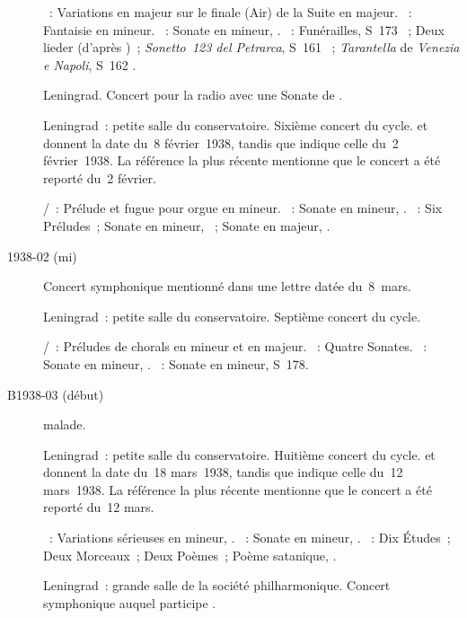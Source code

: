 \begin{description}
 \textsc{\Haendel{}}~: Variations en \kE majeur sur le finale (Air) de la
 Suite  en \kE majeur.
 \textsc{\Mozart{}}~: Fantaisie en \kC mineur.
 \textsc{\Beethoven{}}~: Sonate en \kC mineur, .
 \textsc{\Liszt{}}~: Funérailles, S~173 ~; Deux lieder (d'après
 \Schubert{})~; \emph{Sonetto~123 del Petrarca}, S~161 ~;
 \emph{Tarantella} de \emph{Venezia e Napoli}, S~162 .
 \item[\DateWithWeekDay{1938-02-01}]
 Leningrad.
 Concert pour la radio avec une Sonate de \Haydn{}.
 \item[\DateWithWeekDay{1938-02-08}]
 Leningrad~: petite salle du conservatoire.
 Sixième concert du cycle.
 \citet[p.~158]{Nekrasova08} et \citet[p.~411]{Scriabine} donnent la date
 du~8 février~1938, tandis que \citet[p.~49]{White} indique celle du~2
 février~1938.
 La référence la plus récente mentionne que le concert a été reporté du~2
 février.

 \textsc{\Buxtehude{}/\Nikolaiev{}}~: Prélude et fugue pour orgue en \kF
 \Sharp mineur.
 \textsc{\Schumann{}}~: Sonate en \kF \Sharp mineur, .
 \textsc{\Scriabine{}}~: Six Préludes~; Sonate en \kF \Sharp mineur,
 ~; Sonate en \kF \Sharp majeur, .
 \item[1938-02 (mi)]
 Concert symphonique mentionné dans une lettre datée du~8~mars.
 \item[\DateWithWeekDay{1938-02-24}]
 Leningrad~: petite salle du conservatoire.
 Septième concert du cycle.

 \textsc{\JBach{}/\Busoni{}}~: Préludes de chorals en \kG mineur et en \kG
 majeur.
 \textsc{\Scarlatti{}}~: Quatre Sonates.
 \textsc{\Beethoven{}}~: Sonate en \kF mineur, .
 \textsc{\Liszt{}}~: Sonate en \kB mineur, S~178.
 \item[B1938-03 (début)]
 \VSofronitsky{} malade.
 \item[\DateWithWeekDay{1938-03-18}]
 Leningrad~: petite salle du conservatoire.
 Huitième concert du cycle.
 \citet[p.~158]{Nekrasova08} et \citet[p.~411]{Scriabine} donnent la date
 du~18 mars~1938, tandis que \citet[p.~49]{White} indique celle du~12
 mars~1938.
 La référence la plus récente mentionne que le concert a été reporté du~12
 mars.

 \textsc{\Mendelssohn{}}~: Variations sérieuses en \kD mineur, .
 \textsc{\Chopin{}}~: Sonate en \kB mineur, .
 \textsc{\Scriabine{}}~: Dix Études~; Deux Morceaux~; Deux Poèmes~; Poème
 satanique, .
 \item[\DateWithWeekDay{1938-03-24}]
 Leningrad~: grande salle de la société philharmonique.
 Concert symphonique auquel participe \VSofronitsky{}.


\end{description}
